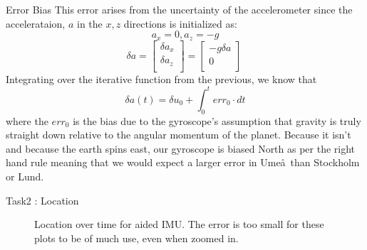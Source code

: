 \documentclass[10pt]{beamer}
\theoremstyle{definition}
\begin{document}
\begin{frame}{Error Bias}
    This error arises from the uncertainty of the accelerometer since the accelerataion, $a$ in the $x,z$ directions is initialized as:
    $$
    a_x = 0, a_z = -g
    $$
    $$
    \delta a = 
    \begin{bmatrix}
        \delta a_x \\
        \delta a_z \\
    \end{bmatrix} = 
    \begin{bmatrix} 
        -g \delta a \\
        0           \\
    \end{bmatrix}
    \
    $$
    Integrating over the iterative function from the previous, we know that
    $$
    \delta a(t) = \delta u_0 + \int_0^t err_0 \cdot dt
    $$
    where the $err_0$ is the bias due to the gyroscope's assumption that gravity is truly straight down relative to the angular momentum of the planet. Because it isn't and because the earth spins east, our gyroscope is biased North as per the right hand rule meaning that we would expect a larger error in Ume\aa~than Stockholm or Lund.
\end{frame}
\begin{frame}{Task2 : Location}
\begin{figure}

    \caption{Location over time for aided IMU.  The error is too small for these plots to be of much use, even when zoomed in.}
    
\end{figure}
\begin{figure}
    
\end{figure}

\end{frame}
\end{document}
